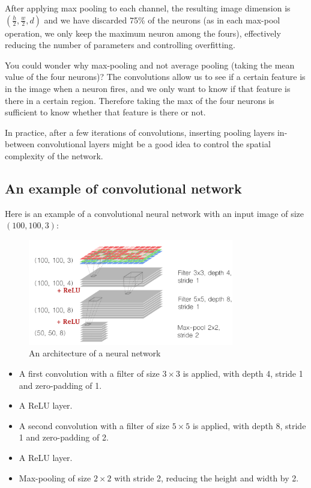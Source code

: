 After applying max pooling to each channel, the resulting image dimension is $(\frac{h}{2}, \frac{w}{2}, d)$ and we have discarded 75\% of the neurons (as in each max-pool operation, we only keep the maximum neuron among the fours), effectively reducing the number of parameters and controlling overfitting.

You could wonder why max-pooling and not average pooling (taking the mean value of the four neurons)? The convolutions allow us to see if a certain feature is in the image when a neuron fires, and we only want to know if that feature is there in a certain region. Therefore taking the max of the four neurons is sufficient to know whether that feature is there or not.

In practice, after a few iterations of convolutions, inserting pooling layers in-between convolutional layers might be a good idea to control the spatial complexity of the network.

\subsection{An example of convolutional network}
Here is an example of a convolutional neural network with an input image of size $(100, 100, 3)$:

\begin{figure}[H]
\centering
\includegraphics[width=0.8\textwidth]{Images/conv_archi.png}
\caption{An architecture of a neural network \cite{gorner}}
\end{figure}

\begin{itemize}
\item A first convolution with a filter of size $3\times3$ is applied, with depth 4, stride 1 and zero-padding of 1.
\item A ReLU layer.
\item A second convolution with a filter of size $5\times5$ is applied, with depth 8, stride 1 and zero-padding of 2.
\item A ReLU layer.
\item Max-pooling of size $2\times2$ with stride 2, reducing the height and width by 2.
\end{itemize}


